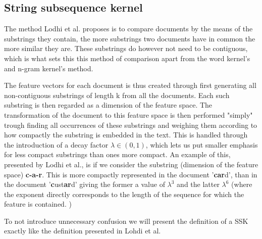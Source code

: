 \subsection{String subsequence kernel}
The method Lodhi et al. proposes is to compare documents by the means of the substrings they contain, the more substrings two documents have in common the more similar they are. These substrings do however not need to be contiguous, which is what sets this this method of comparison apart from the word kernel's and n-gram kernel's method.

The feature vectors for each document is thus created through first generating all non-contiguous substrings of length k from all the documents. Each such substring is then regarded as a dimension of the feature space. The transformation of the document to this feature space is then performed "simply" trough finding all occurrences of these substrings and weighing them according to how compactly the substring is embedded in the text. This is handled through the introduction of a decay factor $ \lambda \in (0,1) $, which lets us put smaller emphasis for less compact substrings than ones more compact. An example of this, presented by Lodhi et al., is if we consider the substring (dimension of the feature space) \textbf{c-a-r}. This is more compactly represented in the document '\textbf{car}d', than in the document '\textbf{c}ust\textbf{ar}d' giving the former a value of $ \lambda^3 $ and the latter $ \lambda^6 $ (where the exponent directly corresponds to the length of the sequence for which the feature is contained. )

To not introduce unnecessary confusion we will present the definition of a SSK exactly like the definition presented in Lohdi et al. 

